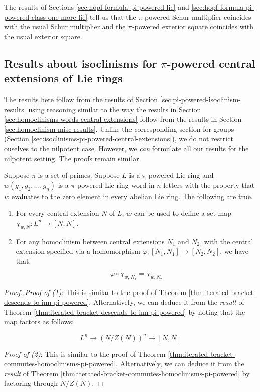 \documentclass{ucetd}
\begin{document}
The results of Sections \ref{sec:hopf-formula-pi-powered-lie} and
\ref{sec:hopf-formula-pi-powered-class-one-more-lie} tell us that the
$\pi$-powered Schur multiplier coincides with the usual Schur
multiplier and the $\pi$-powered exterior square coincides with the
usual exterior square.

\subsection{Results about isoclinisms for $\pi$-powered central extensions of Lie rings}\label{sec:isoclinisms-pi-powered-central-extensions-lie}

The results here follow from the results of Section
\ref{sec:pi-powered-isoclinism-results} using reasoning similar to the
way the results in Section
\ref{sec:homoclinisms-words-central-extensions} follow from the
results in Section \ref{sec:homoclinism-misc-results}. Unlike the
corresponding section for groups (Section
\ref{sec:isoclinisms-pi-powered-central-extensions}), we do not
restrict ouselves to the nilpotent case. However, we {\em can}
formulate all our results for the nilpotent setting. The proofs remain
similar.

\begin{lemma}\label{lemma:iterated-bracket-descends-extension-version-pi-powered}
  Suppose $\pi$ is a set of primes. Suppose $L$ is a $\pi$-powered Lie
  ring and $w(g_1,g_2,\dots,g_n)$ is a $\pi$-powered Lie
  ring word in $n$ letters with the property that $w$ evaluates to the
  zero element in every abelian Lie ring. The following are true.

  \begin{enumerate}
  \item For every central extension $N$ of $L$, $w$ can be used to
    define a set map $\chi_{w,N}: L^n \to [N,N]$.
  \item For any homoclinism between central extensions $N_1$ and
    $N_2$, with the central extension specified via a homomorphism
    $\varphi:[N_1,N_1] \to [N_2,N_2]$, we have that:

    $$\varphi \circ \chi_{w,N_1} = \chi_{w,N_2}$$
  \end{enumerate}
\end{lemma}


\begin{proof}
  {\em Proof of (1)}: This is similar to the proof of Theorem
  \ref{thm:iterated-bracket-descends-to-inn-pi-powered}. Alternatively, we can
  deduce it from the {\em result} of Theorem
  \ref{thm:iterated-bracket-descends-to-inn-pi-powered} by noting that the
  map factors as follows:

  $$L^n \to (N/Z(N))^n \to [N,N]$$

  {\em Proof of (2)}: This is similar to the proof of Theorem
  \ref{thm:iterated-bracket-commutes-homoclinisms-pi-powered}. Alternatively,
  we can deduce it from the {\em result} of Theorem
  \ref{thm:iterated-bracket-commutes-homoclinisms-pi-powered} by factoring
  through $N/Z(N)$.
\end{proof}
\end{document}
